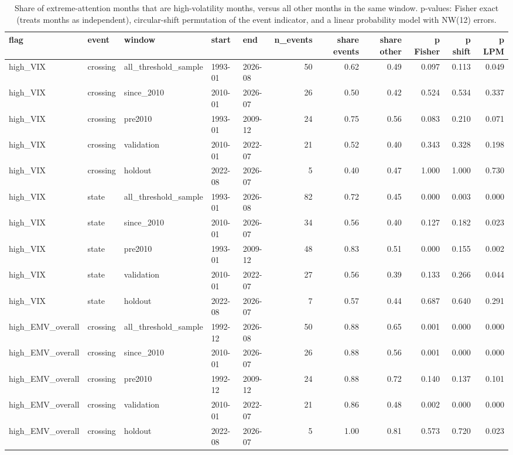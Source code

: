 \begin{table}
\caption{Share of extreme-attention months that are high-volatility months, versus all other months in the same window. p-values: Fisher exact (treats months as independent), circular-shift permutation of the event indicator, and a linear probability model with NW(12) errors.}
\label{tab:m1_cross_vix}
\begin{tabular}{lllllrrrrrr}
\toprule
flag & event & window & start & end & n\_events & share events & share other & p Fisher & p shift & p LPM \\
\midrule
high\_VIX & crossing & all\_threshold\_sample & 1993-01 & 2026-08 & 50 & 0.62 & 0.49 & 0.097 & 0.113 & 0.049 \\
high\_VIX & crossing & since\_2010 & 2010-01 & 2026-07 & 26 & 0.50 & 0.42 & 0.524 & 0.534 & 0.337 \\
high\_VIX & crossing & pre2010 & 1993-01 & 2009-12 & 24 & 0.75 & 0.56 & 0.083 & 0.210 & 0.071 \\
high\_VIX & crossing & validation & 2010-01 & 2022-07 & 21 & 0.52 & 0.40 & 0.343 & 0.328 & 0.198 \\
high\_VIX & crossing & holdout & 2022-08 & 2026-07 & 5 & 0.40 & 0.47 & 1.000 & 1.000 & 0.730 \\
high\_VIX & state & all\_threshold\_sample & 1993-01 & 2026-08 & 82 & 0.72 & 0.45 & 0.000 & 0.003 & 0.000 \\
high\_VIX & state & since\_2010 & 2010-01 & 2026-07 & 34 & 0.56 & 0.40 & 0.127 & 0.182 & 0.023 \\
high\_VIX & state & pre2010 & 1993-01 & 2009-12 & 48 & 0.83 & 0.51 & 0.000 & 0.155 & 0.002 \\
high\_VIX & state & validation & 2010-01 & 2022-07 & 27 & 0.56 & 0.39 & 0.133 & 0.266 & 0.044 \\
high\_VIX & state & holdout & 2022-08 & 2026-07 & 7 & 0.57 & 0.44 & 0.687 & 0.640 & 0.291 \\
high\_EMV\_overall & crossing & all\_threshold\_sample & 1992-12 & 2026-08 & 50 & 0.88 & 0.65 & 0.001 & 0.000 & 0.000 \\
high\_EMV\_overall & crossing & since\_2010 & 2010-01 & 2026-07 & 26 & 0.88 & 0.56 & 0.001 & 0.000 & 0.000 \\
high\_EMV\_overall & crossing & pre2010 & 1992-12 & 2009-12 & 24 & 0.88 & 0.72 & 0.140 & 0.137 & 0.101 \\
high\_EMV\_overall & crossing & validation & 2010-01 & 2022-07 & 21 & 0.86 & 0.48 & 0.002 & 0.000 & 0.000 \\
high\_EMV\_overall & crossing & holdout & 2022-08 & 2026-07 & 5 & 1.00 & 0.81 & 0.573 & 0.720 & 0.023 \\

\end{tabular}
\end{table}
